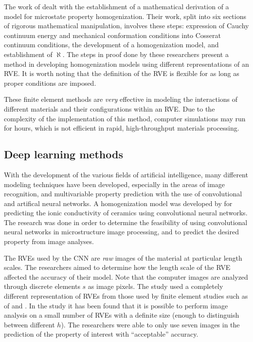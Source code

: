 The work of  dealt with the establishment of a mathematical derivation of a model for microstate property homogenization.
Their work, split into six sections of rigorous mathematical manipulation, involves these steps: expression of Cauchy continuum energy and mechanical conformation conditions into Cosserat continuum conditions, the development of a homogenization model, and establishment of $\aleph$.
The steps in proof done by these researchers present a method in developing homogenization models using different representations of an RVE.
It is worth noting that the definition of the RVE is flexible for as long as proper conditions are imposed.

These finite element methods are \emph{very} effective in modeling the interactions of different materials and their configurations within an RVE.
Due to the complexity of the implementation of this method, computer simulations may run for hours, which is not efficient in rapid, high-throughput materials processing.

\subsection{Deep learning methods}

With the development of the various fields of artificial intelligence, many different modeling techniques have been developed, especially in the areas of image recognition, and multivariable property prediction with the use of convolutional and artifical neural networks.
A homogenization model was developed by  for predicting the ionic conductivity of ceramics using convolutional neural networks.
The research was done in order to determine the feasibility of using convolutional neural networks in microstructure image processing, and to predict the desired property from image analyses.

The RVEs used by the CNN are \emph{raw} images of the material at particular length scales.
The researchers aimed to determine how the length scale of the RVE affected the accuracy of their model.
Note that the computer images are analyzed through discrete elements $s$ as image pixels.
The study used a completely different representation of RVEs from those used by finite element studies such as of  and .
In the study it has been found that it is possible to perform image analysis on a small number of RVEs with a definite size (enough to distinguish between different $h$).
The researchers were able to only use seven images in the prediction of the property of interest with ``acceptable'' accuracy.


